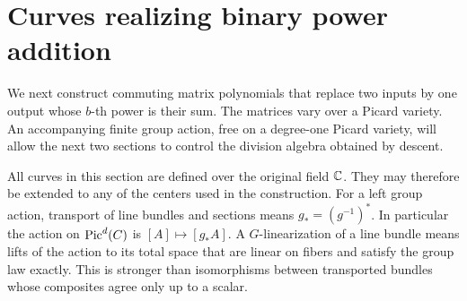 \section{Curves realizing binary power addition}\label{sec:curves}

We next construct commuting matrix polynomials that replace two inputs by
one output whose \(b\)-th power is their sum.  The matrices vary over a
Picard variety.  An accompanying finite group action, free on a
degree-one Picard variety, will allow the next two sections to control
the division algebra obtained by descent.

All curves in this section are defined over the original field \(\mathbb C\).
They may therefore be extended to any of the centers used in the
construction.  For a left group action, transport of line bundles and
sections means \(g_*=(g^{-1})^*\).  In particular the action on
\(\operatorname{Pic}^d(C)\) is \([A]\mapsto[g_*A]\).
A \(G\)-linearization of a line bundle means lifts of the action to its
total space that are linear on fibers and satisfy the group law exactly.
This is stronger than isomorphisms between transported bundles whose
composites agree only up to a scalar.

